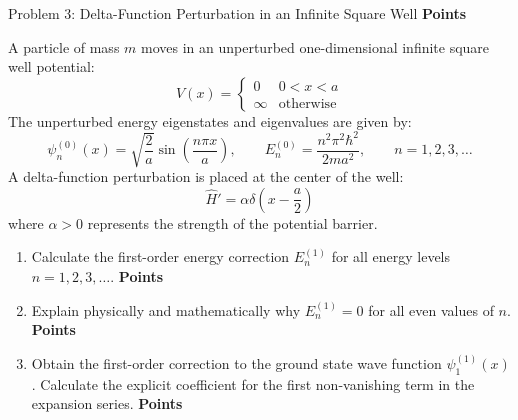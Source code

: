 \documentclass[11pt, a4paper, parskip=half]{scrartcl}
\newcommand{\points}[1]{\hfill{\sffamily\bfseries\color{QMAccent}\lbrack #1 Points\rbrack}}
\begin{document}
\vspace{3mm}

\begin{problembox}{Problem 3: Delta-Function Perturbation in an Infinite Square Well \points{35}}

A particle of mass $m$ moves in an unperturbed one-dimensional infinite square well potential:
\[
V(x) = \begin{cases} 0 & 0 < x < a \\ \infty & \text{otherwise} \end{cases}
\]
The unperturbed energy eigenstates and eigenvalues are given by:
\[
\psi_n^{(0)}(x) = \sqrt{\frac{2}{a}} \sin\left( \frac{n\pi x}{a} \right), \qquad E_n^{(0)} = \frac{n^2 \pi^2 \hbar^2}{2m a^2}, \qquad n = 1, 2, 3, \dots
\]
A delta-function perturbation is placed at the center of the well:
\[
\hat{H}' = \alpha \delta\left( x - \frac{a}{2} \right)
\]
where $\alpha > 0$ represents the strength of the potential barrier.

\begin{enumerate}[label=\bfseries(\alph*), leftmargin=*, itemsep=3pt]
  \item Calculate the first-order energy correction $E_n^{(1)}$ for all energy levels $n = 1, 2, 3, \dots$. \points{12}
  
  \item Explain physically and mathematically why $E_n^{(1)} = 0$ for all even values of $n$. \points{8}
  
  \item Obtain the first-order correction to the ground state wave function $\psi_1^{(1)}(x)$. Calculate the explicit coefficient for the first non-vanishing term in the expansion series. \points{15}
\end{enumerate}

\end{problembox}
\end{document}
